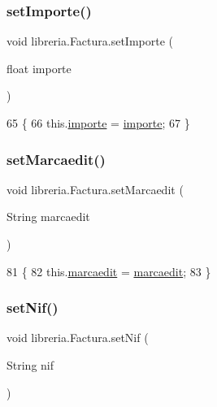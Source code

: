 \subsubsection{\texorpdfstring{set\+Importe()}{setImporte()}}
{\footnotesize\ttfamily void libreria.\+Factura.\+set\+Importe (\begin{DoxyParamCaption}\item[{float}]{importe }\end{DoxyParamCaption})\hspace{0.3cm}{\ttfamily [inline]}}


\begin{DoxyCode}
65                                           \{
66         this.\mbox{\hyperlink{classlibreria_1_1_factura_ad6da76d97fe2956e230c0757d14ae664}{importe}} = \mbox{\hyperlink{classlibreria_1_1_factura_ad6da76d97fe2956e230c0757d14ae664}{importe}};
67     \}
\end{DoxyCode}
\mbox{\label{classlibreria_1_1_factura_aeef83df1d8b190938fe112bff6e0a224}} 
\subsubsection{\texorpdfstring{set\+Marcaedit()}{setMarcaedit()}}
{\footnotesize\ttfamily void libreria.\+Factura.\+set\+Marcaedit (\begin{DoxyParamCaption}\item[{String}]{marcaedit }\end{DoxyParamCaption})\hspace{0.3cm}{\ttfamily [inline]}}


\begin{DoxyCode}
81                                                \{
82         this.\mbox{\hyperlink{classlibreria_1_1_factura_a71087e2afc07fab380ed309a19577cec}{marcaedit}} = \mbox{\hyperlink{classlibreria_1_1_factura_a71087e2afc07fab380ed309a19577cec}{marcaedit}};
83     \}
\end{DoxyCode}
\mbox{\label{classlibreria_1_1_factura_ad2e689e4a7d63abe394f6a3f043afdb7}} 
\subsubsection{\texorpdfstring{set\+Nif()}{setNif()}}
{\footnotesize\ttfamily void libreria.\+Factura.\+set\+Nif (\begin{DoxyParamCaption}\item[{String}]{nif }\end{DoxyParamCaption})\hspace{0.3cm}{\ttfamily [inline]}}


